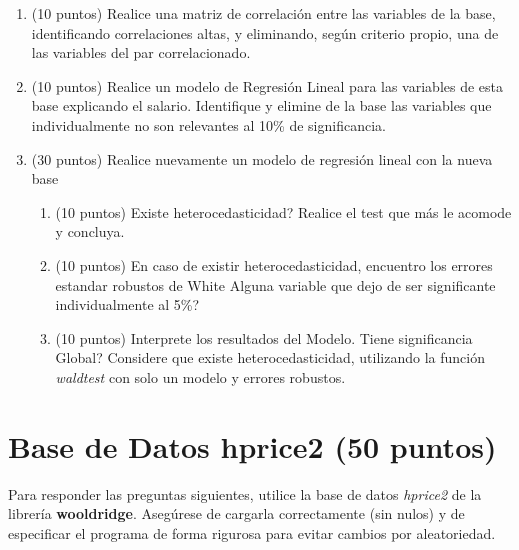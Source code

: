\documentclass[letterpaper,11pt]{article}
\begin{document}
\begin{enumerate}

\item (10 puntos) Realice una matriz de correlación entre las variables de la base, identificando correlaciones altas, y eliminando, según criterio propio, una de las variables del par correlacionado.




    \item (10 puntos) Realice un modelo de Regresión Lineal para las variables de esta base explicando el salario. Identifique y elimine de la base las variables que individualmente no son relevantes al 10\% de significancia. 
    



    \item (30 puntos) Realice nuevamente un modelo de regresión lineal con la nueva base 
    \begin{enumerate}
        \item  (10 puntos) \textquestiondown Existe heterocedasticidad? Realice el test que más le acomode y concluya.

        \item (10 puntos) En caso de existir heterocedasticidad, encuentro los errores estandar robustos de White \textquestiondown Alguna variable que dejo de ser significante individualmente al 5\%?

        \item (10 puntos) Interprete los resultados del Modelo. \textquestiondown Tiene significancia Global? Considere que existe heterocedasticidad, utilizando la función \textit{waldtest} con solo un modelo y errores robustos. 
     
    \end{enumerate} 
  \end{enumerate} 

\section{Base de Datos hprice2 (50 puntos)}

Para responder las preguntas siguientes, utilice la base de datos \textit{hprice2} de la librería \textbf{wooldridge}. Asegúrese de cargarla correctamente (sin nulos) y de especificar el programa de forma rigurosa para evitar cambios por aleatoriedad.
\end{document}
